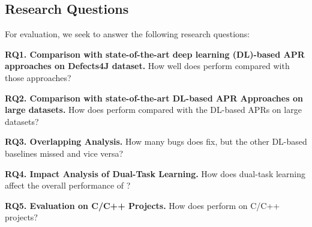 \subsection{Research Questions}

For evaluation, we seek to answer the following research questions:

\noindent\textbf{RQ1. Comparison with state-of-the-art deep learning
  (DL)-based APR approaches on Defects4J dataset.}  How well does
                {\tool} perform compared with those approaches?



\noindent\textbf{RQ2. Comparison with state-of-the-art DL-based APR Approaches on large datasets.}  
How does {\tool} perform compared with the DL-based APRs on large datasets?


\noindent\textbf{RQ3. Overlapping Analysis.} How many bugs does
{\tool} fix, but the other DL-based baselines
                missed and vice versa?

\noindent\textbf{RQ4. Impact Analysis of Dual-Task Learning.} How does
dual-task learning affect the overall performance of {\tool}?


\noindent\textbf{RQ5. Evaluation on C/C++ Projects.} How does {\tool} perform on C/C++ projects?
